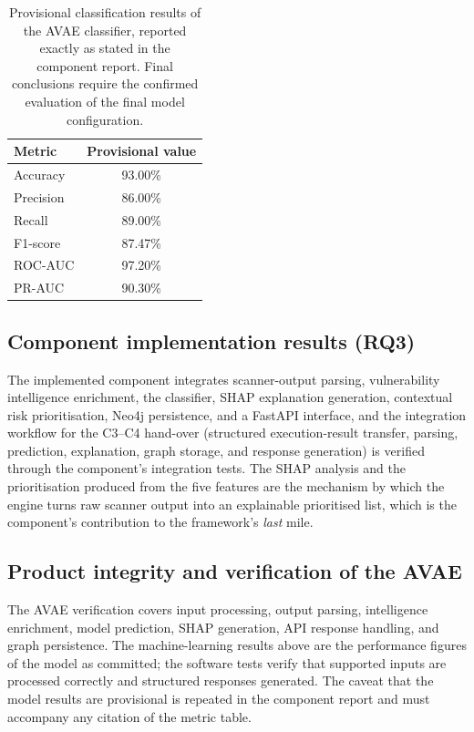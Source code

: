 \begin{table}[htbp]
  \centering
  \begin{tabular}{@{}lc@{}}
    \toprule
    \textbf{Metric} & \textbf{Provisional value}\\
    \midrule
    Accuracy & 93.00\%\\
    Precision & 86.00\%\\
    Recall & 89.00\%\\
    F1-score & 87.47\%\\
    ROC-AUC & 97.20\%\\
    PR-AUC & 90.30\%\\
    \bottomrule
  \end{tabular}
  \caption{Provisional classification results of the AVAE classifier, reported
  exactly as stated in the component report. Final conclusions require the
  confirmed evaluation of the final model configuration.}\label{tab:avae-provisional}
\end{table}

\subsection{Component implementation results (RQ3)}\label{sec:results-avae-impl}

The implemented component integrates scanner-output parsing, vulnerability
intelligence enrichment, the classifier, SHAP explanation generation, contextual
risk prioritisation, Neo4j persistence, and a FastAPI interface, and the
integration workflow for the C3--C4 hand-over (structured execution-result
transfer, parsing, prediction, explanation, graph storage, and response
generation) is verified through the component's integration tests. The SHAP
analysis and the prioritisation produced from the five features are the
mechanism by which the engine turns raw scanner output into an explainable
prioritised list, which is the component's contribution to the framework's
\emph{last} mile.

\subsection{Product integrity and verification of the AVAE}\label{sec:results-avae-integrity}

The AVAE verification covers input processing, output parsing, intelligence
enrichment, model prediction, SHAP generation, API response handling, and graph
persistence. The machine-learning results above are the performance figures of
the model as committed; the software tests verify that supported inputs are
processed correctly and structured responses generated. The caveat that the
model results are provisional is repeated in the component report and must
accompany any citation of the metric table.

